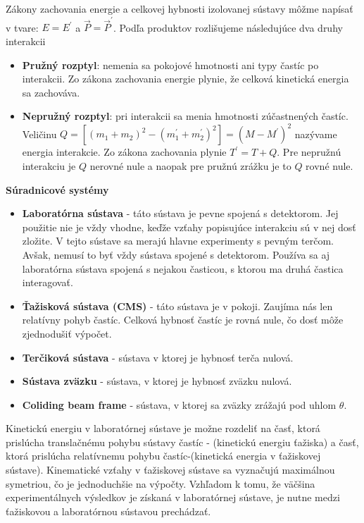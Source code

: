 \documentclass[../../main.tex]{subfiles}
\begin{document}
Zákony zachovania energie a celkovej hybnosti izolovanej sústavy môžme napísať v tvare: $E=E^{\prime}$ a $\vec{P}=\vec{P}^{\prime}$. Podľa produktov rozlišujeme následujúce dva druhy interakcii
\begin{itemize}
	\item \textbf{Pružný rozptyl}: nemenia sa pokojové hmotnosti ani typy častíc po interakcii. Zo zákona zachovania energie plynie, že celková kinetická energia sa zachováva.
	\item \textbf{Nepružný rozptyl}: pri interakcii sa menia hmotnosti zúčastnených častíc. Veličinu $Q=[(m_1+m_2)^2-(m_1^{\prime}+m_2^{\prime})^2]=(M-M^{\prime})^2$ nazývame energia interakcie. Zo zákona zachovania plynie $T^{\prime}=T+Q$. Pre nepružnú interakciu je $Q$ nerovné nule a naopak pre pružnú zrážku je to $Q$ rovné nule. 
\end{itemize}
\textbf{Súradnicové systémy}\par
\begin{itemize}
	\item \textbf{Laboratórna sústava} - táto sústava je pevne spojená s detektorom. Jej použitie nie je vždy vhodne, keďže vzťahy popisujúce interakciu sú v nej dosť zložite. V tejto sústave sa merajú hlavne experimenty s pevným terčom. Avšak, nemusí to byť vždy sústava spojené s detektorom. Používa sa aj laboratórna sústava spojená s nejakou časticou, s ktorou ma druhá častica interagovať.
	\item \textbf{Ťažisková sústava (CMS)} - táto sústava je v pokoji. Zaujíma nás len relatívny pohyb častíc. Celková hybnosť častíc je rovná nule, čo dosť môže zjednodušiť výpočet.
	\item \textbf{Terčiková sústava} - sústava v ktorej je hybnosť terča nulová.
	\item \textbf{Sústava zväzku} - sústava, v ktorej je hybnosť zväzku nulová.
	\item \textbf{Coliding beam frame} - sústava, v ktorej sa zväzky zrážajú pod uhlom $\theta$.
\end{itemize}
Kinetickú energiu v laboratórnej sústave je možne rozdeliť na časť, ktorá prislúcha translačnému pohybu sústavy častíc - (kinetickú energiu ťažiska) a časť, ktorá prislúcha relatívnemu pohybu častíc-(kinetická energia v ťažiskovej sústave). Kinematické vzťahy v ťažiskovej sústave sa vyznačujú maximálnou symetriou, čo je jednoduchšie na výpočty. Vzhľadom k tomu, že väčšina experimentálnych výsledkov je získaná v laboratórnej sústave, je nutne medzi ťažiskovou a laboratórnou sústavou prechádzať.
\end{document}
